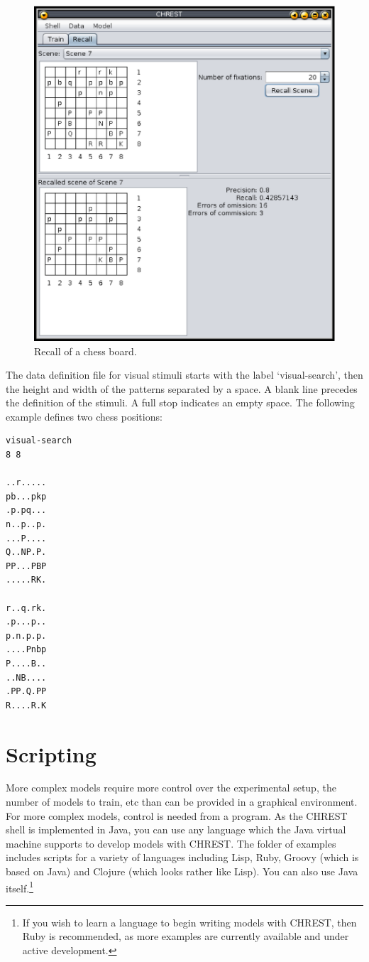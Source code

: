 \documentclass{article}
\begin{document}
\begin{figure}
\includegraphics[width=\textwidth]{images/recall.eps}
\caption{Recall of a chess board.}
\label{recall}
\end{figure}

The data definition file for visual stimuli starts with the label
`visual-search', then the height and width of the patterns separated by a
space.  A blank line precedes the definition of the stimuli.  A full stop
indicates an empty space.  The following example defines two chess positions:

\begin{verbatim}
visual-search
8 8

..r.....
pb...pkp
.p.pq...
n..p..p.
...P....
Q..NP.P.
PP...PBP
.....RK.

r..q.rk.
.p...p..
p.n.p.p.
....Pnbp
P....B..
..NB....
.PP.Q.PP
R....R.K
\end{verbatim}

\newpage
\section{Scripting}

More complex models require more control over the experimental setup, the
number of models to train, etc than can be provided in a graphical environment.
For more complex models, control is needed from a program.  As the CHREST shell
is implemented in Java, you can use any language which the Java virtual machine
supports to develop models with CHREST.  The folder of examples includes
scripts for a variety of languages including Lisp, Ruby, Groovy (which is based
on Java) and Clojure (which looks rather like Lisp).  You can also use Java
itself.\footnote{If you wish to learn a language to begin writing models with
CHREST, then Ruby is recommended, as more examples are currently available and
under active development.}
\end{document}
